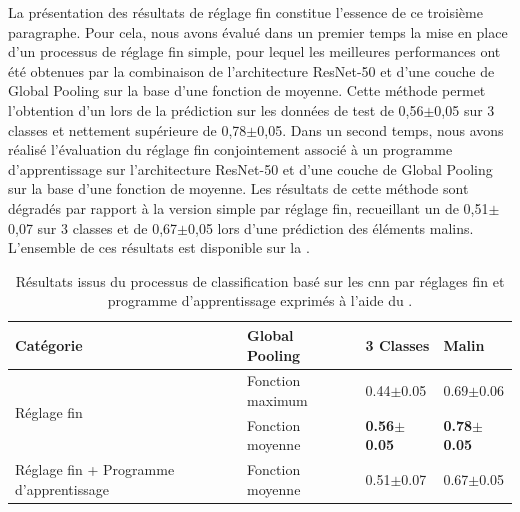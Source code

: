 La présentation des résultats de réglage fin constitue l'essence de ce troisième paragraphe. Pour cela, nous avons évalué dans un premier temps la mise en place d'un processus de réglage fin simple, pour lequel les meilleures performances ont été obtenues par la combinaison de l'architecture ResNet-50 et d'une couche de Global Pooling sur la base d'une fonction de moyenne. Cette méthode permet l'obtention d'un \fscore{} lors de la prédiction sur les données de test de 0,56$\pm$0,05 sur 3 classes et nettement supérieure de 0,78$\pm$0,05. Dans un second temps, nous avons réalisé l'évaluation du réglage fin conjointement associé à un programme d'apprentissage sur l'architecture ResNet-50 et d'une couche de Global Pooling sur la base d'une fonction de moyenne. Les résultats de cette méthode sont dégradés par rapport à la version simple par réglage fin, recueillant un \fscore{} de 0,51$\pm$0,07 sur 3 classes et de 0,67$\pm$0,05 lors d'une prédiction des éléments malins. L'ensemble de ces résultats est disponible sur la .\par

\begin{table}[H]
    \centering
    \begin{tabular}{llll}
        \toprule
        Catégorie                               & Global Pooling    & 3 Classes         & Malin             \\ \midrule
        \multirow{2}{*}{Réglage fin}            & Fonction maximum  & 0.44$\pm$0.05         & 0.69$\pm$0.06         \\ \cline{2-4}
                                                & Fonction moyenne  & \textbf{0.56$\pm$0.05}& \textbf{0.78$\pm$0.05}\\ \midrule
        Réglage fin + Programme d'apprentissage & Fonction moyenne  & 0.51$\pm$0.07         & 0.67$\pm$0.05         \\
        \bottomrule
    \end{tabular}
    
    \caption{Résultats issus du processus de classification basé sur les \gls{cnn} par réglages fin et programme d'apprentissage exprimés à l'aide du \fscore.}
    \label{tab:parameters_image_improvement_fine}
\end{table}

